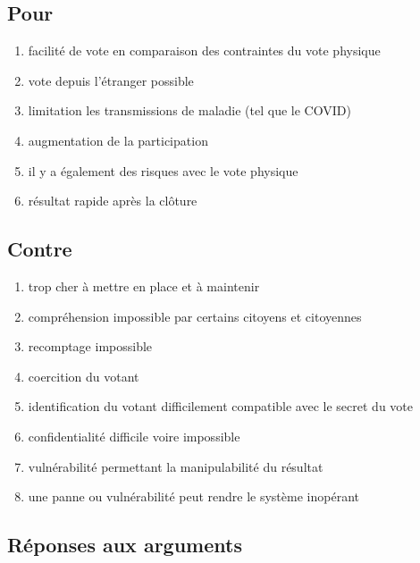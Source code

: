\documentclass[../report]{subfiles}
\begin{document}
\newpage
\begin{multicols}{2}
\subsection{Pour}\label{sec:diff-meth:args:pour}
\begin{enumerate}
	\item facilité de vote en comparaison des contraintes du vote physique
	\item vote depuis l'étranger possible
	\item limitation les transmissions de maladie (tel que le COVID)
	\item augmentation de la participation
	\item il y a également des risques avec le vote physique
	\item résultat rapide après la clôture
\end{enumerate}
\newcolumn
\subsection{Contre}\label{sec:diff-meth:args:contre}
\begin{enumerate}
	\item trop cher à mettre en place et à maintenir
	\item compréhension impossible par certains citoyens et citoyennes
	\item recomptage impossible
	\item coercition du votant
	\item identification du votant difficilement compatible avec le secret du vote
	\item confidentialité difficile voire impossible
	\item vulnérabilité permettant la manipulabilité du résultat
	\item une panne ou vulnérabilité peut rendre le système inopérant
\end{enumerate}
\end{multicols}

\subsection{Réponses aux arguments}
\end{document}
